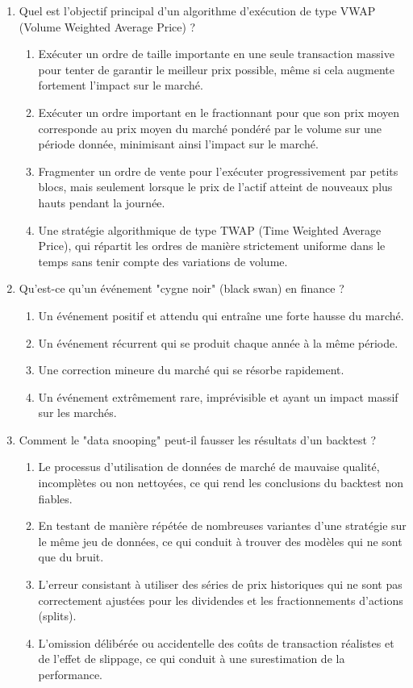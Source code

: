\documentclass[a4paper,12pt]{article}
\begin{document}
\begin{enumerate}
    \item Quel est l'objectif principal d'un algorithme d'exécution de type VWAP (Volume Weighted Average Price) ?
    \begin{enumerate}[label=(\Alph*)]
        \item Exécuter un ordre de taille importante en une seule transaction massive pour tenter de garantir le meilleur prix possible, même si cela augmente fortement l'impact sur le marché.
        \item Exécuter un ordre important en le fractionnant pour que son prix moyen corresponde au prix moyen du marché pondéré par le volume sur une période donnée, minimisant ainsi l'impact sur le marché.
        \item Fragmenter un ordre de vente pour l'exécuter progressivement par petits blocs, mais seulement lorsque le prix de l'actif atteint de nouveaux plus hauts pendant la journée.
        \item Une stratégie algorithmique de type TWAP (Time Weighted Average Price), qui répartit les ordres de manière strictement uniforme dans le temps sans tenir compte des variations de volume.
    \end{enumerate}
    \item Qu'est-ce qu'un événement "cygne noir" (black swan) en finance ?
    \begin{enumerate}[label=(\Alph*)]
        \item Un événement positif et attendu qui entraîne une forte hausse du marché.
        \item Un événement récurrent qui se produit chaque année à la même période.
        \item Une correction mineure du marché qui se résorbe rapidement.
        \item Un événement extrêmement rare, imprévisible et ayant un impact massif sur les marchés.
    \end{enumerate}
    
    \item Comment le "data snooping" peut-il fausser les résultats d'un backtest ?
    \begin{enumerate}[label=(\Alph*)]
        \item Le processus d'utilisation de données de marché de mauvaise qualité, incomplètes ou non nettoyées, ce qui rend les conclusions du backtest non fiables.
        \item En testant de manière répétée de nombreuses variantes d'une stratégie sur le même jeu de données, ce qui conduit à trouver des modèles qui ne sont que du bruit.
        \item L'erreur consistant à utiliser des séries de prix historiques qui ne sont pas correctement ajustées pour les dividendes et les fractionnements d'actions (splits).
        \item L'omission délibérée ou accidentelle des coûts de transaction réalistes et de l'effet de slippage, ce qui conduit à une surestimation de la performance.
    \end{enumerate}


\end{enumerate}
\end{document}
